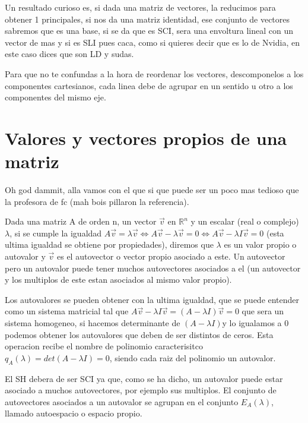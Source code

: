 \documentclass[11pt,a4paper]{article}
\begin{document}
Un resultado curioso es, si dada una matriz de vectores, la reducimos para obtener 1 principales, si nos da una matriz identidad, ese conjunto de vectores sabremos que es una base, si se da que es SCI, sera una envoltura lineal con un vector de mas y si es SLI pues caca, como si quieres decir que es lo de Nvidia, en este caso dices que son LD y sudas.

Para que no te confundas a la hora de reordenar los vectores, descomponelos a los componentes cartesianos, cada linea debe de agrupar en un sentido u otro a los componentes del mismo eje.

\section{Valores y vectores propios de una matriz}

Oh god dammit, alla vamos con el que si que puede ser un poco mas tedioso que la profesora de fc (mah bois pillaron la referencia). 

Dada una matriz A de orden n, un vector $\vec{v}$ en $\mathbb{R}^n$ y un escalar (real o complejo) $\lambda$, si se cumple la igualdad $A\vec{v}=\lambda \vec{v}\Leftrightarrow A\vec{v}-\lambda \vec{v}=0\Leftrightarrow A\vec{v}-\lambda I \vec{v}=0$ (esta ultima igualdad se obtiene por propiedades), diremos que $\lambda$ es un valor propio o autovalor y $\vec{v}$ es el autovector o vector propio asociado a este. Un autovector pero un autovalor puede tener muchos autovectores asociados a el (un autovector y los multiplos de este estan asociados al mismo valor propio). 

Los autovalores se pueden obtener con la ultima igualdad, que se puede entender como un sistema matricial tal que $A\vec{v}-\lambda I \vec{v}=(A-\lambda I)\vec{v}=0$ que sera un sistema homogeneo, si hacemos determinante de $(A-\lambda I)$y lo igualamos a 0 podemos obtener los autovalores que deben de ser distintos de ceros. Esta operacion recibe el nombre de polinomio caracterisitco $q_A(\lambda )=det(A-\lambda I)=0$, siendo cada raiz del polinomio un autovalor.

 El SH debera de ser SCI ya que, como se ha dicho, un autovalor puede estar asociado a muchos autovectores, por ejemplo sus multiplos. El conjunto de autovectores asociados a un autovalor se agrupan en el conjunto $E_A (\lambda )$, llamado autoespacio o espacio propio.
\end{document}
